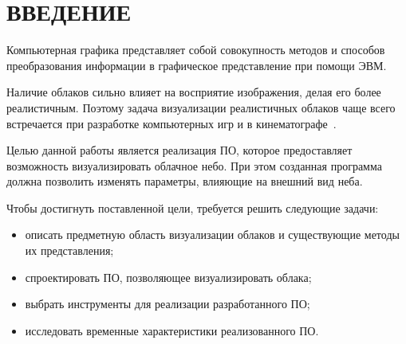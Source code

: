 \chapter*{ВВЕДЕНИЕ}

Компьютерная графика представляет собой совокупность методов
и способов преобразования информации в графическое представление при
помощи ЭВМ.

Наличие облаков сильно влияет на восприятие изображения, делая его более реалистичным. Поэтому задача визуализации реалистичных облаков чаще всего встречается при разработке компьютерных игр и в кинематографе~\cite{oz, hzd, frostbite}. 

Целью данной работы является реализация ПО, которое предоставляет возможность визуализировать облачное небо. При этом созданная программа должна позволить изменять параметры, влияющие на внешний вид неба.

Чтобы достигнуть поставленной цели, требуется решить следующие задачи:

\begin{itemize}
	\item описать предметную область визуализации облаков и существующие методы их представления;
	\item спроектировать ПО, позволяющее визуализировать облака;
	\item выбрать инструменты для реализации разработанного ПО;
	\item исследовать временные характеристики реализованного ПО.
\end{itemize}